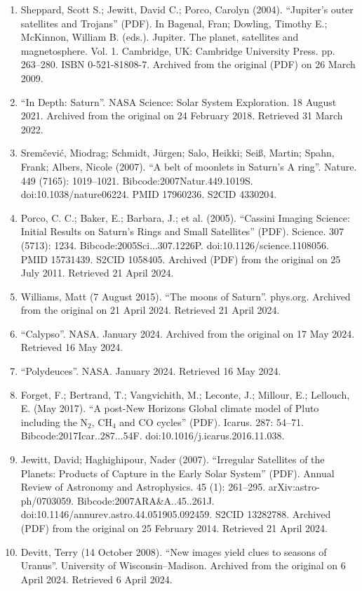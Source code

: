 \begin{enumerate}
\item Sheppard, Scott S.; Jewitt, David C.; Porco, Carolyn (2004). ``Jupiter's outer satellites and Trojans'' (PDF). In Bagenal, Fran; Dowling, Timothy E.; McKinnon, William B. (eds.). Jupiter. The planet, satellites and magnetosphere. Vol. 1. Cambridge, UK: Cambridge University Press. pp. 263–280. ISBN 0-521-81808-7. Archived from the original (PDF) on 26 March 2009.
\item ``In Depth: Saturn''. NASA Science: Solar System Exploration. 18 August 2021. Archived from the original on 24 February 2018. Retrieved 31 March 2022.
\item Sremčević, Miodrag; Schmidt, Jürgen; Salo, Heikki; Seiß, Martin; Spahn, Frank; Albers, Nicole (2007). ``A belt of moonlets in Saturn's A ring''. Nature. 449 (7165): 1019–1021. Bibcode:2007Natur.449.1019S. doi:10.1038/nature06224. PMID 17960236. S2CID 4330204.
\item Porco, C. C.; Baker, E.; Barbara, J.; et al. (2005). ``Cassini Imaging Science: Initial Results on Saturn's Rings and Small Satellites'' (PDF). Science. 307 (5713): 1234. Bibcode:2005Sci...307.1226P. doi:10.1126/science.1108056. PMID 15731439. S2CID 1058405. Archived (PDF) from the original on 25 July 2011. Retrieved 21 April 2024.
\item Williams, Matt (7 August 2015). ``The moons of Saturn''. phys.org. Archived from the original on 21 April 2024. Retrieved 21 April 2024.
\item ``Calypso''. NASA. January 2024. Archived from the original on 17 May 2024. Retrieved 16 May 2024.
\item ``Polydeuces''. NASA. January 2024. Retrieved 16 May 2024.
\item Forget, F.; Bertrand, T.; Vangvichith, M.; Leconte, J.; Millour, E.; Lellouch, E. (May 2017). ``A post-New Horizons Global climate model of Pluto including the N$_2$, CH$_4$ and CO cycles'' (PDF). Icarus. 287: 54–71. Bibcode:2017Icar..287...54F. doi:10.1016/j.icarus.2016.11.038.
\item Jewitt, David; Haghighipour, Nader (2007). ``Irregular Satellites of the Planets: Products of Capture in the Early Solar System'' (PDF). Annual Review of Astronomy and Astrophysics. 45 (1): 261–295. arXiv:astro-ph/0703059. Bibcode:2007ARA\&A..45..261J. doi:10.1146/annurev.astro.44.051905.092459. S2CID 13282788. Archived (PDF) from the original on 25 February 2014. Retrieved 21 April 2024.
\item Devitt, Terry (14 October 2008). ``New images yield clues to seasons of Uranus''. University of Wisconsin–Madison. Archived from the original on 6 April 2024. Retrieved 6 April 2024.

\end{enumerate}
